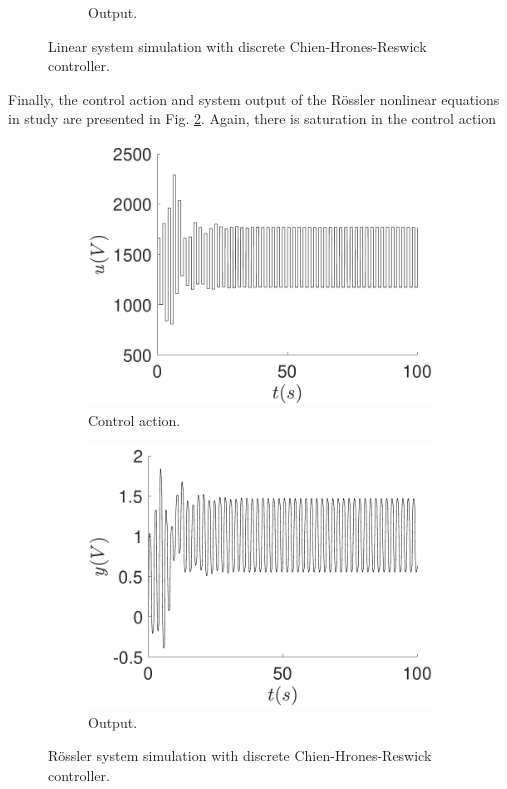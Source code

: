 \begin{figure}
\begin{subfigure}[b]{0.475\textwidth}
            \caption{Output.}
        \end{subfigure}
        \caption{Linear system simulation with discrete Chien-Hrones-Reswick controller.}
        \label{fig:chr_linear}
	\end{figure}
    
    Finally, the control action and system output of the Rössler nonlinear equations in study are presented in Fig. \ref{fig:chr}. Again, there is saturation in the control action 
    
    \begin{figure}
        \centering
        \begin{subfigure}[b]{0.475\textwidth}
            \centering
            \includegraphics[scale=0.425]{files/heuristic/CHR/plot_control_CHR.pdf}
            \caption{Control action.}
        \end{subfigure}
        \vskip0.1cm
        \begin{subfigure}[b]{0.475\textwidth}   
            \centering 
            \includegraphics[scale=0.425]{files/heuristic/CHR/plot_y_CHR.pdf}
            \caption{Output.}
        \end{subfigure}
        \caption{Rössler system simulation with discrete Chien-Hrones-Reswick controller.}
        \label{fig:chr}
	\end{figure}



